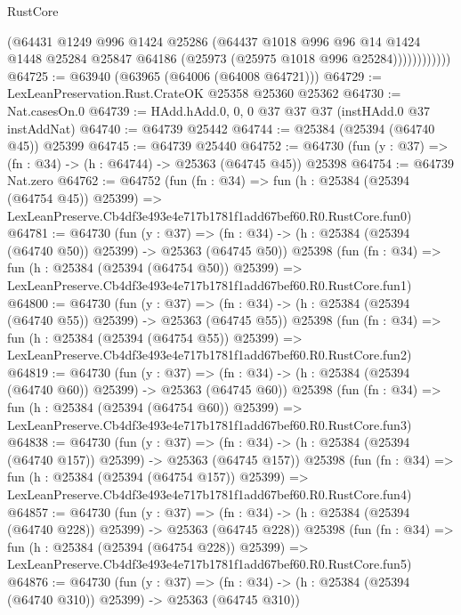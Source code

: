 \begin{lexlean}{RustCore}
\begin{coremodule}
                    (@64431
                      @1249
                      @996
                      @1424
                      @25286
                      (@64437
                        @1018
                        @996
                        @96
                        @14
                        @1424
                        @1448
                        @25284
                        @25847
                        @64186
                        (@25973 (@25975 @1018 @996 @25284))))))))))))
@64725 := @63940 (@63965 (@64006 (@64008 @64721)))
@64729 := LexLeanPreservation.Rust.CrateOK @25358 @25360 @25362
@64730 := Nat.casesOn.{0}
@64739 := HAdd.hAdd.{0, 0, 0} @37 @37 @37 (instHAdd.{0} @37 instAddNat)
@64740 := @64739 @25442
@64744 := @25384 (@25394 (@64740 @45)) @25399
@64745 := @64739 @25440
@64752 := @64730 (fun (y : @37) => (fn : @34) -> (h : @64744) -> @25363 (@64745 @45)) @25398
@64754 := @64739 Nat.zero
@64762 := @64752
    (fun (fn : @34) =>
    fun (h : @25384 (@25394 (@64754 @45)) @25399) =>
    LexLeanPreserve.Cb4df3e493e4e717b1781f1add67bef60.R0.RustCore.fun0)
@64781 := @64730
    (fun (y : @37) =>
    (fn : @34) -> (h : @25384 (@25394 (@64740 @50)) @25399) -> @25363 (@64745 @50))
    @25398
    (fun (fn : @34) =>
    fun (h : @25384 (@25394 (@64754 @50)) @25399) =>
    LexLeanPreserve.Cb4df3e493e4e717b1781f1add67bef60.R0.RustCore.fun1)
@64800 := @64730
    (fun (y : @37) =>
    (fn : @34) -> (h : @25384 (@25394 (@64740 @55)) @25399) -> @25363 (@64745 @55))
    @25398
    (fun (fn : @34) =>
    fun (h : @25384 (@25394 (@64754 @55)) @25399) =>
    LexLeanPreserve.Cb4df3e493e4e717b1781f1add67bef60.R0.RustCore.fun2)
@64819 := @64730
    (fun (y : @37) =>
    (fn : @34) -> (h : @25384 (@25394 (@64740 @60)) @25399) -> @25363 (@64745 @60))
    @25398
    (fun (fn : @34) =>
    fun (h : @25384 (@25394 (@64754 @60)) @25399) =>
    LexLeanPreserve.Cb4df3e493e4e717b1781f1add67bef60.R0.RustCore.fun3)
@64838 := @64730
    (fun (y : @37) =>
    (fn : @34) -> (h : @25384 (@25394 (@64740 @157)) @25399) -> @25363 (@64745 @157))
    @25398
    (fun (fn : @34) =>
    fun (h : @25384 (@25394 (@64754 @157)) @25399) =>
    LexLeanPreserve.Cb4df3e493e4e717b1781f1add67bef60.R0.RustCore.fun4)
@64857 := @64730
    (fun (y : @37) =>
    (fn : @34) -> (h : @25384 (@25394 (@64740 @228)) @25399) -> @25363 (@64745 @228))
    @25398
    (fun (fn : @34) =>
    fun (h : @25384 (@25394 (@64754 @228)) @25399) =>
    LexLeanPreserve.Cb4df3e493e4e717b1781f1add67bef60.R0.RustCore.fun5)
@64876 := @64730
    (fun (y : @37) =>
    (fn : @34) -> (h : @25384 (@25394 (@64740 @310)) @25399) -> @25363 (@64745 @310))

\end{coremodule}
\end{lexlean}
